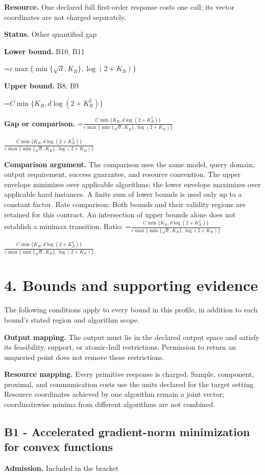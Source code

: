 \documentclass[10pt,a4paper]{article}
\newcommand{\AtlasMath}[1]{\par\begingroup\centering\setbox0=\hbox{$\displaystyle #1$}\ifdim\wd0>1.4\linewidth\typeout{ATLAS WIDE FORMULA: \the\wd0}\fi\ifdim\wd0>\linewidth\resizebox{\linewidth}{!}{\box0}\else\box0\fi\par\endgroup}
\newcommand{\AtlasInlineMath}[1]{\begingroup\setbox0=\hbox{$#1$}\ifdim\wd0>.4\linewidth\endgroup\AtlasMath{#1}\else\endgroup$#1$\fi}
\begin{document}
\textbf{Resource.} One declared full first-order response costs one call; its vector coordinates are not charged separately.

\textbf{Status.} Other quantified gap

\textbf{Lower bound.} B10, B11

\AtlasMath{c\max\{\min\{\sqrt d,K_R\},\log(2+K_R)\}}
\textbf{Upper bound.} B8, B9

\AtlasMath{C\min\{K_R,d\log(2+K_R^2)\}}
\textbf{Gap or comparison.} \AtlasInlineMath{\frac{C\min\{K_R,d\log(2+K_R^2)\}}{c\max\{\min\{\sqrt d,K_R\},\log(2+K_R)\}}}

\textbf{Comparison argument.} The comparison uses the same model, query domain, output requirement, success guarantee, and resource convention. The upper envelope minimizes over applicable algorithms; the lower envelope maximizes over applicable hard instances. A finite sum of lower bounds is used only up to a constant factor. Rate comparison: Both bounds and their validity regions are retained for this contract. An intersection of upper bounds alone does not establish a minimax transition. Ratio: \AtlasInlineMath{\frac{C\min\{K_R,d\log(2+K_R^2)\}}{c\max\{\min\{\sqrt d,K_R\},\log(2+K_R)\}}}

\section{4. Bounds and supporting evidence}
The following conditions apply to every bound in this profile, in addition to each bound's stated region and algorithm scope.

\textbf{Output mapping.} The output must lie in the declared output space and satisfy its feasibility, support, or atomic-hull restrictions. Permission to return an unqueried point does not remove these restrictions.

\textbf{Resource mapping.} Every primitive response is charged. Sample, component, proximal, and communication costs use the units declared for the target setting. Resource coordinates achieved by one algorithm remain a joint vector; coordinatewise minima from different algorithms are not combined.

\subsection{B1 - Accelerated gradient-norm minimization for convex functions}
\textbf{Admission.} Included in the bracket
\end{document}
